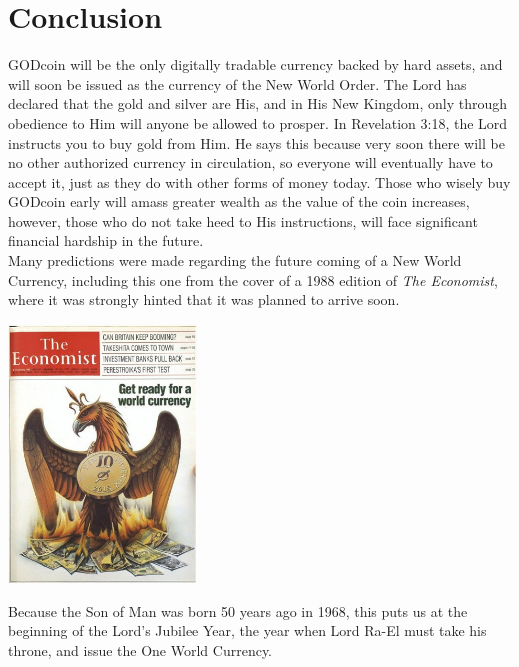 \documentclass[12pt,a4paper]{article}
\begin{document}
  \newpage
  \section{Conclusion}
  GODcoin will be the only digitally tradable currency backed by hard assets,
  and will soon be issued as the currency of the New World Order. The Lord has
  declared that the gold and silver are His, and in His New Kingdom, only
  through obedience to Him will anyone be allowed to prosper. In Revelation
  3:18, the Lord instructs you to buy gold from Him. He says this because very
  soon there will be no other authorized currency in circulation, so everyone
  will eventually have to accept it, just as they do with other forms of money
  today. Those who wisely buy GODcoin early will amass greater wealth as the
  value of the coin increases, however, those who do not take heed to His
  instructions, will face significant financial hardship in the future.\\

  Many predictions were made regarding the future coming of a New World
  Currency, including this one from the cover of a 1988 edition of \textit{The
  Economist}\cite{the-economist}, where it was strongly hinted that it was
  planned to arrive soon.\\

  \begin{center}
    \includegraphics[width=50mm]{economist.png}\\
  \end{center}
  \vspace{3mm}

  Because the Son of Man was born 50 years ago in 1968, this puts us at the
  beginning of the Lord’s Jubilee Year, the year when Lord Ra-El must take his
  throne, and issue the One World Currency.\\
\end{document}
